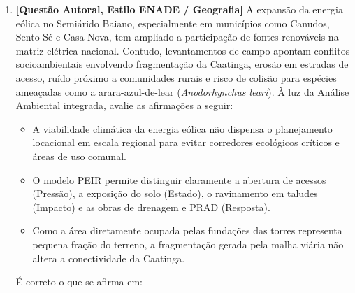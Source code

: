 \begin{enumerate}[leftmargin=1.8em, itemsep=7pt]
  \item \textbf{[Questão Autoral, Estilo ENADE / Geografia]} A expansão da energia eólica no Semiárido Baiano, especialmente em municípios como Canudos, Sento Sé e Casa Nova, tem ampliado a participação de fontes renováveis na matriz elétrica nacional. Contudo, levantamentos de campo apontam conflitos socioambientais envolvendo fragmentação da Caatinga, erosão em estradas de acesso, ruído próximo a comunidades rurais e risco de colisão para espécies ameaçadas como a arara-azul-de-lear (\textit{Anodorhynchus leari}). À luz da Análise Ambiental integrada, avalie as afirmações a seguir:
  \begin{itemize}[leftmargin=1.4em, itemsep=2pt]
    \item[I.] A viabilidade climática da energia eólica não dispensa o planejamento locacional em escala regional para evitar corredores ecológicos críticos e áreas de uso comunal.
    \item[II.] O modelo PEIR permite distinguir claramente a abertura de acessos (Pressão), a exposição do solo (Estado), o ravinamento em taludes (Impacto) e as obras de drenagem e PRAD (Resposta).
    \item[III.] Como a área diretamente ocupada pelas fundações das torres representa pequena fração do terreno, a fragmentação gerada pela malha viária não altera a conectividade da Caatinga.
  \end{itemize}
  É correto o que se afirma em:


\end{enumerate}
